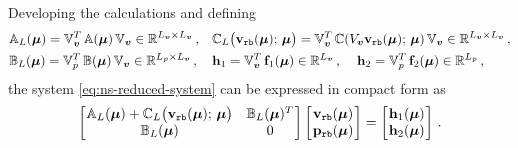 \documentclass[12pt, a4paper, twoside, openright, notitlepage]{report}
\numberwithin{equation}{chapter}
\theoremstyle{theorem}
\theoremstyle{definition}
\theoremstyle{remark}
\theoremstyle{proposition}
\numberwithin{figure}{chapter}
\newcommand{\bg}[1]{\boldsymbol{#1}}
\begin{document}
		Developing the calculations and defining
		\begin{equation*}
			\begin{aligned}
				& \mathbb{A}_L(\bg{\mu}) = \mathbb{V}_{\bg{v}}^T \, \mathbb{A}(\bg{\mu}) \, \mathbb{V}_{\bg{v}} \in \mathbb{R}^{L_{\bg{v}} \times L_{\bg{v}}} \, , && \mathbb{C}_L \big( \mathbf{v}_{\texttt{rb}}(\bg{\mu}); \, \bg{\mu} \big) =  \mathbb{V}_{\bg{v}}^T \, \mathbb{C}(V_{\bg{v}} \mathbf{v}_{\texttt{rb}}(\bg{\mu}); \, \bg{\mu}) \, \mathbb{V}_{\bg{v}} \in \mathbb{R}^{L_{\bg{v}} \times L_{\bg{v}}} \, , \\
				& \mathbb{B}_L(\bg{\mu}) = \mathbb{V}_p^T \, \mathbb{B}(\bg{\mu}) \, \mathbb{V}_{\bg{v}} \in \mathbb{R}^{L_p \times L_{\bg{v}}} \, , && \mathbf{h}_1 = \mathbb{V}_{\bg{v}}^T \, \mathbf{f}_1(\bg{\mu}) \in \mathbb{R}^{L_{\bg{v}}} \, , \hspace*{0.4cm} \mathbf{h}_2 = \mathbb{V}_p^T \, \mathbf{f}_2(\bg{\mu}) \in \mathbb{R}^{L_p} \, , 
			\end{aligned}
		\end{equation*}
		the system \eqref{eq:ns-reduced-system} can be expressed in compact form as
		\begin{equation*}
			\begin{bmatrix}
			\hspace*{-0.15cm}
			\begin{array}{cc}
				\mathbb{A}_L(\bg{\mu}) + \mathbb{C}_L \big( \mathbf{v}_{\texttt{rb}}(\bg{\mu}); \, \bg{\mu} \big) & \mathbb{B}_L(\bg{\mu})^T \\
				\mathbb{B}_L(\bg{\mu}) & 0
			\end{array} 
			\hspace*{-0.15cm}
			\end{bmatrix} 
			\begin{bmatrix}
			\hspace*{-0.15cm}
			\begin{array}{c}
				\mathbf{v}_{\texttt{rb}}(\bg{\mu}) \\
				\mathbf{p}_{\texttt{rb}}(\bg{\mu})
			\end{array} 
			\hspace*{-0.15cm}
			\end{bmatrix} 
			=
			\begin{bmatrix}
			\hspace*{-0.15cm}
			\begin{array}{c}
				\mathbf{h}_1(\bg{\mu}) \\
				\mathbf{h}_2(\bg{\mu})
			\end{array} 
			\hspace*{-0.15cm}
			\end{bmatrix} \, .
		\end{equation*}
\end{document}
